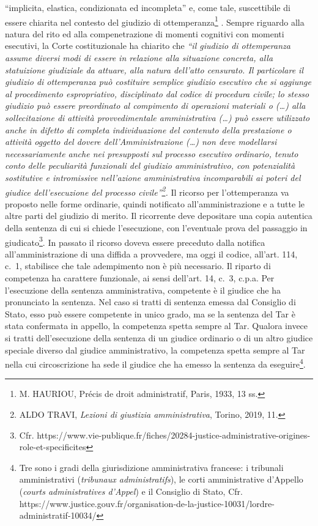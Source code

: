 \documentclass[12pt,it,a4paper,]{report}
\begin{document}
``implicita, elastica, condizionata ed incompleta'' e, come tale,
suscettibile di essere chiarita nel contesto del giudizio di
ottemperanza\footnote{M. HAURIOU, Précis de droit administratif, Paris,
  1933, 13 ss.} . Sempre riguardo alla natura del rito ed alla
compenetrazione di momenti cognitivi con momenti esecutivi, la Corte
costituzionale ha chiarito che \emph{``il giudizio di ottemperanza
assume diversi modi di essere in relazione alla situazione concreta,
alla statuizione giudiziale da attuare, alla natura dell'atto censurato.
Il particolare il giudizio di ottemperanza può costituire semplice
giudizio esecutivo che si aggiunge al procedimento espropriativo,
disciplinato dal codice di procedura civile; lo stesso giudizio può
essere preordinato al compimento di operazioni materiali o (\ldots) alla
sollecitazione di attività provvedimentale amministrativa (\ldots) può
essere utilizzato anche in difetto di completa individuazione del
contenuto della prestazione o attività oggetto del dovere
dell'Amministrazione (\ldots) non deve modellarsi necessariamente anche
nei presupposti sul processo esecutivo ordinario, tenuto conto delle
peculiarità funzionali del giudizio amministrativo, con potenzialità
sostitutive e intromissive nell'azione amministrativa incomparabili ai
poteri del giudice dell'esecuzione del processo civile''\footnote{ALDO
  TRAVI, \emph{Lezioni di giustizia amministrativa}, Torino, 2019, 11.}.}
Il ricorso per l'ottemperanza va proposto nelle forme ordinarie, quindi
notificato all'amministrazione e a tutte le altre parti del giudizio di
merito. Il ricorrente deve depositare una copia autentica della sentenza
di cui si chiede l'esecuzione, con l'eventuale prova del passaggio in
giudicato\footnote{Cfr.
  https://www.vie-publique.fr/fiches/20284-justice-administrative-origines-role-et-specificites}.
In passato il ricorso doveva essere preceduto dalla notifica
all'amministrazione di una diffida a provvedere, ma oggi il codice,
all'art. 114, c.~1, stabilisce che tale adempimento non è più
necessario. Il riparto di competenza ha carattere funzionale, ai sensi
dell'art. 14, c.~3, c.p.a. Per l'esecuzione della sentenza
amministrativa, competente è il giudice che ha pronunciato la sentenza.
Nel caso si tratti di sentenza emessa dal Consiglio di Stato, esso può
essere competente in unico grado, ma se la sentenza del Tar è stata
confermata in appello, la competenza spetta sempre al Tar. Qualora
invece si tratti dell'esecuzione della sentenza di un giudice ordinario
o di un altro giudice speciale diverso dal giudice amministrativo, la
competenza spetta sempre al Tar nella cui circoscrizione ha sede il
giudice che ha emesso la sentenza da eseguire\footnote{Tre sono i gradi
  della giurisdizione amministrativa francese: i tribunali
  amministrativi (\emph{tribunaux administratifs}), le corti
  amministrative d'Appello (\emph{courts administratives d'Appel}) e il
  Consiglio di Stato, Cfr.
  https://www.justice.gouv.fr/organisation-de-la-justice-10031/lordre-administratif-10034/}.
\end{document}
